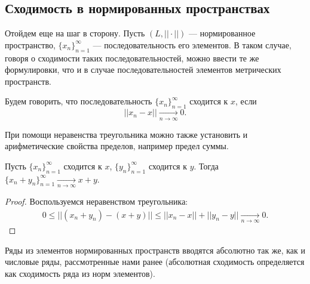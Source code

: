 \subsection{Сходимость в нормированных пространствах}
Отойдем еще на шаг в сторону. Пусть $(L, ||\cdot||)$ --- нормированное пространство, $\{x_n\}_{n=1}^{\infty}$ --- последовательность его элементов. В таком случае, говоря о сходимости таких последовательностей, можно ввести те же формулировки, что и в случае последовательностей элементов метрических пространств.
\begin{Def}
    Будем говорить, что последовательность $\{x_n\}_{n=1}^{\infty}$ сходится к $x$, если 
    $$
        ||x_n - x|| \underset{n\to \infty}{\to} 0.
    $$
\end{Def}
При помощи неравенства треугольника можно также установить и арифметические свойства пределов, например предел суммы.
\begin{Statement}
    Пусть $\{x_n\}_{n=1}^{\infty}$ сходится к $x$, $\{y_n\}_{n=1}^{\infty}$ сходится к $y$. Тогда  $\{x_n + y_n\}_{n=1}^{\infty} \underset{n\to \infty}{\to} x+y$.
\end{Statement}
\begin{proof}
    Воспользуемся неравенством треугольника:
    \begin{gather*}
        0\leqslant ||(x_n + y_n) - (x + y)|| \leqslant ||x_n-x|| + ||y_n - y|| \underset{n\to\infty}{\to} 0.
    \end{gather*}
\end{proof}
Ряды из элементов нормированных пространств вводятся абсолютно так же, как и числовые ряды, рассмотренные нами ранее (абсолютная сходимость определяется как сходимость ряда из норм элементов).

